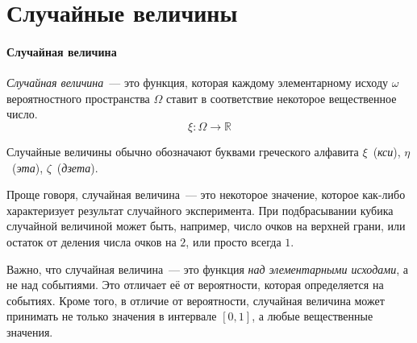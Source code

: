\documentclass[11pt]{article}
\begin{document}
\section{Случайные величины}

\paragraph{Случайная величина} \emph{Случайная величина}~--- это функция,
которая каждому элементарному исходу $\omega$ вероятностного пространства
$\Omega$ ставит в соответствие некоторое вещественное число.
$$\xi:\Omega\to\mathbb{R}$$

Случайные величины обычно обозначают буквами греческого алфавита
$\xi$~(\emph{кси}), $\eta$~(\emph{эта}), $\zeta$~(\emph{дзета}).

Проще говоря, случайная величина~--- это некоторое значение, которое как-либо
характеризует результат случайного эксперимента. При подбрасывании кубика случайной
величиной может быть, например, число очков на верхней грани, или остаток от деления
числа очков на $2$, или просто всегда $1$.

Важно, что случайная величина~--- это функция \emph{над элементарными исходами}, а не
над событиями. Это отличает её от вероятности, которая определяется на событиях. Кроме
того, в отличие от вероятности, случайная величина может принимать не только значения
в интервале $[0,1]$, а любые вещественные значения.
\end{document}
